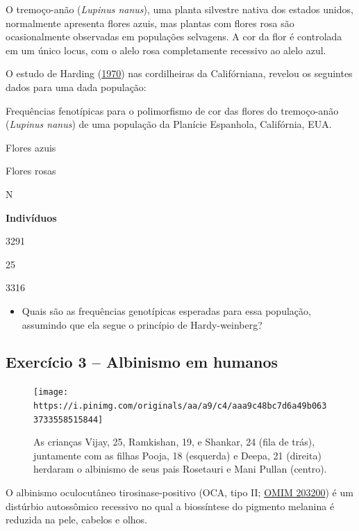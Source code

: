 \documentclass[
]{book}
\providecommand{\tightlist}{%
  \setlength{\itemsep}{0pt}\setlength{\parskip}{0pt}}
\begin{document}
O tremoço-anão (\emph{Lupinus nanus}), uma planta silvestre nativa dos estados unidos, normalmente apresenta flores azuis, mas plantas com flores rosa são ocasionalmente observadas em populações selvagens. A cor da flor é controlada em um único locus, com o alelo rosa completamente recessivo ao alelo azul.

O estudo de Harding (\href{https://doi.org/10.1111/j.1558-5646.1970.tb01744.x}{1970}) nas cordilheiras da Califórniana, revelou os seguintes dados para uma dada população:

\label{tab:tableB05}Frequências fenotípicas para o polimorfismo de cor das flores do tremoço-anão (\emph{Lupinus nanus}) de uma população da Planície Espanhola, Califórnia, EUA.

Flores azuis

Flores rosas

N

\textbf{Indivíduos}

3291

25

3316

\begin{itemize}
\tightlist
\item
  Quais são as frequências genotípicas esperadas para essa população, assumindo que ela segue o princípio de Hardy-weinberg?
\end{itemize}

\hypertarget{exercuxedcio-3-albinismo-em-humanos}{%
\subsection{Exercício 3 -- Albinismo em humanos}\label{exercuxedcio-3-albinismo-em-humanos}}

\begin{figure}

{\centering \texttt{[image: https://i.pinimg.com/originals/aa/a9/c4/aaa9c48bc7d6a49b0633733558515844]} 

}

\caption{As crianças Vijay, 25, Ramkishan, 19, e Shankar, 24 (fila de trás), juntamente com as filhas Pooja, 18 (esquerda) e Deepa, 21 (direita) herdaram o albinismo de seus pais Rosetauri e Mani Pullan (centro).}\label{fig:familialbino}
\end{figure}

O albinismo oculocutâneo tirosinase-positivo (OCA, tipo II; \href{https://www.omim.org/entry/203200}{OMIM 203200}) é um distúrbio autossômico recessivo no qual a biossíntese do pigmento melanina é reduzida na pele, cabelos e olhos.
\end{document}
